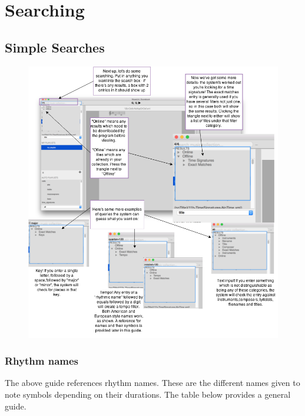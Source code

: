 \section{Searching}
\subsection{Simple Searches}
\begin{figure}[H]
\centering
\includegraphics[width=500pt]{searching}
\end{figure}
\subsubsection{Rhythm names}
The above guide references rhythm names. These are the different names given to note symbols depending on their durations. The table below provides a general guide.


